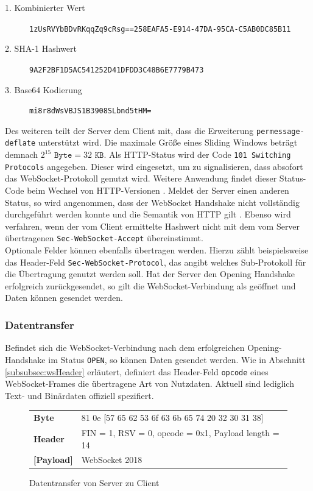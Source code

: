 \documentclass[11pt,a4paper,titlepage]{scrartcl}
\numberwithin{equation}{section}
\begin{document}
\begin{description}
	\item[1. Kombinierter Wert] \texttt{1zUsRVYbBDvRKqqZq9cRsg==258EAFA5-E914-47DA-95CA-C5AB0DC85B11}
	\item[2. SHA-1 Hashwert] \texttt{9A2F2BF1D5AC541252D41DFDD3C48B6E7779B473}
	\item[3. Base64 Kodierung] \texttt{mi8r8dWsVBJS1B3908SLbnd5tHM=}
\end{description}

\noindent Des weiteren teilt der Server dem Client mit, dass die Erweiterung \texttt{permessage-deflate} unterstützt wird. Die maximale Größe eines Sliding Windows beträgt demnach $ 2^{15} \texttt{ Byte} =  32 \texttt{ KB}$. Als HTTP-Status wird der Code \texttt{101 Switching Protocols} angegeben. Dieser wird eingesetzt, um zu signalisieren, dass absofort das WebSocket-Protokoll genutzt wird. Weitere Anwendung findet dieser Status-Code beim Wechsel von HTTP-Versionen \autocite{leach_hypertext_1999}. Meldet der Server einen anderen Status, so wird angenommen, dass der WebSocket Handshake nicht vollständig durchgeführt werden konnte und die Semantik von HTTP gilt \autocite[7]{fette_websocket_2011}. Ebenso wird verfahren, wenn der vom Client ermittelte Hashwert nicht mit dem vom Server übertragenen \texttt{Sec-WebSocket-Accept} übereinstimmt.\\

\noindent Optionale Felder können ebenfalls übertragen werden. Hierzu zählt beispielsweise das Header-Feld \texttt{Sec-WebSocket-Protocol}, das angibt welches Sub-Protokoll für die Übertragung genutzt werden soll. Hat der Server den Opening Handshake erfolgreich zurückgesendet, so gilt die WebSocket-Verbindung als geöffnet und Daten können gesendet werden.

\subsubsection{Datentransfer}\label{subsubsec:wsData}
Befindet sich die WebSocket-Verbindung nach dem erfolgreichen Opening-Handshake im Status \texttt{OPEN}, so können Daten gesendet werden. Wie in Abschnitt \ref{subsubsec:wsHeader} erläutert, definiert das Header-Feld \texttt{opcode} eines WebSocket-Frames die übertragene Art von Nutzdaten. Aktuell sind lediglich Text- und Binärdaten offiziell spezifiert. 

\begin{figure}[ht]
	\begin{center}
		\begin{tabular}{ll}
			\textbf{Byte} & 81 0e [57 65 62 53 6f 63 6b 65 74 20 32 30 31 38] \\
			\textbf{Header} & FIN = 1, RSV = 0, opcode = 0x1, Payload length = 14 \\
			 \textbf{[Payload]} & WebSocket 2018 \\
		\end{tabular}
	\vspace{-5mm}
	\end{center}
	\caption{Datentransfer von Server zu Client}
	\label{fig:wsDataTransfer}
\end{figure}
\end{document}
